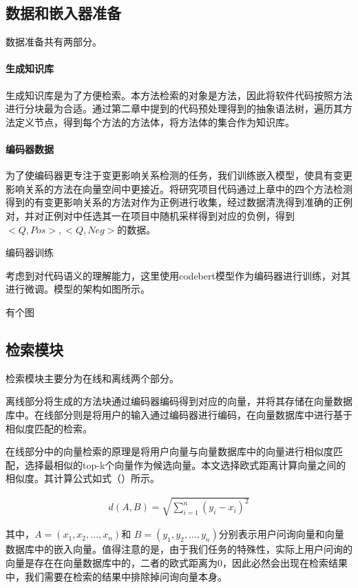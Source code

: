 \subsection{数据和嵌入器准备}

数据准备共有两部分。

\paragraph{生成知识库} 生成知识库是为了方便检索。本方法检索的对象是方法，因此将软件代码按照方法进行分块最为合适。通过第二章中提到的代码预处理得到的抽象语法树，遍历其方法定义节点，得到每个方法的方法体，将方法体的集合作为知识库。

\paragraph{编码器数据} 为了使编码器更专注于变更影响关系检测的任务，我们训练嵌入模型，使具有变更影响关系的方法在向量空间中更接近。将研究项目代码通过上章中的四个方法检测得到的有变更影响关系的方法对作为正例进行收集，经过数据清洗得到准确的正例对，并对正例对中任选其一在项目中随机采样得到对应的负例，得到$<Q,Pos>,<Q,Neg>$的数据。


编码器训练

考虑到对代码语义的理解能力，这里使用codebert模型作为编码器进行训练，对其进行微调。模型的架构如图所示。

有个图


\subsection{检索模块}

检索模块主要分为在线和离线两个部分。

离线部分将生成的方法块通过编码器编码得到对应的向量，并将其存储在向量数据库中。在线部分则是将用户的输入通过编码器进行编码，在向量数据库中进行基于相似度匹配的检索。


在线部分中的向量检索的原理是将用户向量与向量数据库中的向量进行相似度匹配，选择最相似的top-k个向量作为候选向量。本文选择欧式距离计算向量之间的相似度。其计算公式如式（）所示。


\begin{align}
d(A, B) = \sqrt{\sum_{i=1}^{n} (y_i - x_i)^2}
\end{align}

其中，$A = (x_1, x_2, \dots, x_n)$和 $ B = (y_1, y_2, \dots, y_n)$分别表示用户问询向量和向量数据库中的嵌入向量。值得注意的是，由于我们任务的特殊性，实际上用户问询的向量是存在在向量数据库中的，二者的欧式距离为0，因此必然会出现在检索结果中，我们需要在检索的结果中排除掉问询向量本身。



